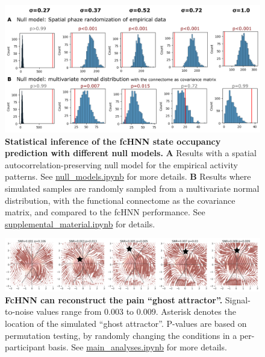 \documentclass{article}
\begin{document}
\begin{figure}[!htbp]
\centering
\includegraphics[width=0.7\linewidth]{files/si_state_occupancy_n-9cf2a0581497182b17cd1066f30e6765.png}
\caption[]{\textbf{Statistical inference of the fcHNN state occupancy prediction with different null models.}
\textbf{A} Results with a spatial autocorrelation-preserving null model for the empirical activity patterns. See \href{https://github.com/pni-lab/connattractor/blob/master/notebooks/null\_models.ipynb}{null\_models.ipynb} for more details.
\textbf{B} Results where simulated samples are randomly sampled from a multivariate normal distribution, with the functional connectome as the covariance matrix, and compared to the fcHNN performance. See \href{https://github.com/pni-lab/connattractor/blob/master/notebooks/supplemental\_material.ipynb}{supplemental\_material.ipynb} for details.}
\label{si_state_occupancy_null_models}
\end{figure}

\begin{figure}[!htbp]
\centering
\includegraphics[width=0.7\linewidth]{files/si_pain_ghost_attrac-7ec7ee237a71533da0cfce1f27dd5b27.png}
\caption[]{\textbf{FcHNN can reconstruct the pain ``ghost attractor''.}
Signal-to-noise values range from 0.003 to 0.009. Asterisk denotes the location of the simulated ``ghost attractor''. P-values are based on permutation testing, by randomly changing the conditions in a per-participant basis. See \href{https://github.com/pni-lab/connattractor/blob/master/notebooks/main\_analyses.ipynb}{main\_analyses.ipynb} for more details.}
\label{si_pain_ghost_attractor_sim}
\end{figure}
\end{document}
